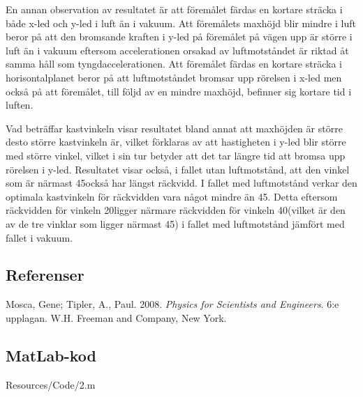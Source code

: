 En annan observation av resultatet är att föremålet färdas en kortare sträcka i både x-led och y-led i luft än i vakuum. Att föremålets maxhöjd blir mindre i luft beror på att den bromsande kraften i y-led på föremålet på vägen upp är större i luft än i vakuum eftersom accelerationen orsakad av luftmotståndet är riktad åt samma håll som tyngdaccelerationen. Att föremålet färdas en kortare sträcka i horisontalplanet beror på att luftmotståndet bromsar upp rörelsen i x-led men också på att föremålet, till följd av en mindre maxhöjd, befinner sig kortare tid i luften.

Vad beträffar kastvinkeln visar resultatet bland annat att maxhöjden är större desto större kastvinkeln är, vilket förklaras av att hastigheten i y-led blir större med större vinkel, vilket i sin tur betyder att det tar längre tid att bromsa upp rörelsen i y-led. Resultatet visar också, i fallet utan luftmotstånd, att den vinkel som är närmast 45\degree också har längst räckvidd. I fallet med luftmotstånd verkar den optimala kastvinkeln för räckvidden vara något mindre än 45\degree. Detta eftersom räckvidden för vinkeln 20\degree ligger närmare räckvidden för vinkeln 40\degree (vilket är den av de tre vinklar som ligger närmast 45\degree) i fallet med luftmotstånd jämfört med fallet i vakuum.

\subsection*{Referenser}
Mosca, Gene; Tipler, A., Paul. 2008. \textit{Physics for Scientists and Engineers}. 6:e upplagan. W.H. Freeman and Company, New York.

\np
\subsection*{MatLab-kod}
 {Resources/Code/2.m}





